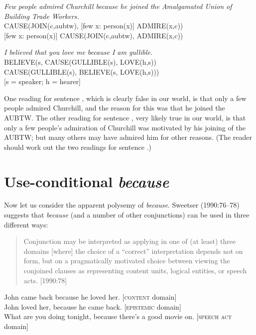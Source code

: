 \ea
\textit{Few people admired Churchill because he joined the Amalgamated Union of Building Trade Workers.}\\
\ea CAUSE(JOIN(c,aubtw), [few x: person(x)] ADMIRE(x,c))\\
\ex{} [few x: person(x)] CAUSE(JOIN(c,aubtw), ADMIRE(x,c))
                       \z
\z

\ea
\textit{I believed that you love me because I am gullible.}\\
\ea BELIEVE(s, CAUSE(GULLIBLE(s), LOVE(h,s))\\
\ex CAUSE(GULLIBLE(s), BELIEVE(s, LOVE(h,s)))\\
    {}[s = speaker; h = hearer]
                       \z
\z


One reading for sentence , which is clearly false in our world, is that only a few people admired Churchill, and the reason for this was that he joined the AUBTW. The other reading for sentence , very likely true in our world, is that only a few people’s admiration of Churchill was motivated by his joining of the AUBTW; but many others may have admired him for other reasons. (The reader should work out the two readings for sentence .)


\section{Use-conditional \textit{because}}\label{sec:18.3}

Now let us consider the apparent polysemy of \textit{because}. Sweetser (1990:76–78) suggests that \textit{because} (and a number of other conjunctions) can be used in three different ways: 


\begin{quote}
Conjunction may be interpreted as applying in one of (at least) three domains [where] the choice of a “correct” interpretation depends not on form, but on a pragmatically motivated choice between viewing the conjoined clauses as representing content units, logical entities, or speech acts. [1990:78]
\end{quote}

\ea
\ea John came back because he loved her.   [\textsc{content} domain]\\
\ex John loved her, because he came back.   [\textsc{epistemic} domain]\\
\ex What are you doing tonight, because there’s a good movie on. [\textsc{speech act} domain]
                       \z
\z


